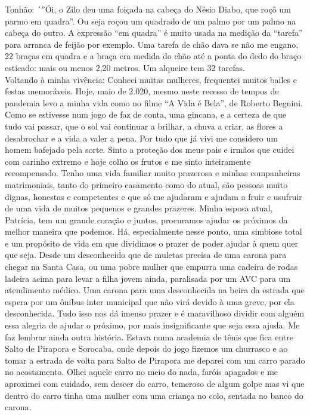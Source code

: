 \documentclass[12pt,brazil,]{book}
\begin{document}
Tonhão: ´''Ói, o Zilo deu uma foiçada na cabeça do Nésio Diabo, que roçô
um parmo em quadra''. Ou seja roçou um quadrado de um palmo por um palmo
na cabeça do outro. A expressão ``em quadra'' é muito usada na medição
da ``tarefa'' para arranca de feijão por exemplo. Uma tarefa de chão
dava se não me engano, 22 braças em quadra e a braça era medida do chão
até a ponta do dedo do braço esticado: mais ou menos 2,20 metros. Um
alqueire tem 32 tarefas.\\
Voltando à minha vivência: Conheci muitas mulheres, frequentei muitos
bailes e festas memoráveis. Hoje, maio de 2.020, mesmo neste recesso de
tempos de pandemia levo a minha vida como no filme ``A Vida é Bela'', de
Roberto Begnini. Como se estivesse num jogo de faz de conta, uma
gincana, e a certeza de que tudo vai passar, que o sol vai continuar a
brilhar, a chuva a criar, as flores a desabrochar e a vida a valer a
pena. Por tudo que já vivi me considero um homem bafejado pela sorte.
Sinto a proteção dos meus pais e irmãos que cuidei com carinho extremo e
hoje colho os frutos e me sinto inteiramente recompensado. Tenho uma
vida familiar muito prazerosa e minhas companheiras matrimoniais, tanto
do primeiro casamento como do atual, são pessoas muito dignas, honestas
e competentes e que só me ajudaram e ajudam a fruir e usufruir de uma
vida de muitos pequenos e grandes prazeres. Minha esposa atual,
Patrícia, tem um grande coração e juntos, procuramos ajudar os próximos
da melhor maneira que podemos. Há, especialmente nesse ponto, uma
simbiose total e um propósito de vida em que dividimos o prazer de poder
ajudar à quem quer que seja. Desde um desconhecido que de muletas
precisa de uma carona para chegar na Santa Casa, ou uma pobre mulher que
empurra uma cadeira de rodas ladeira acima para levar a filha jovem
ainda, paralisada por um AVC para um atendimento médico. Uma carona para
uma desconhecida na beira da estrada que espera por um ônibus inter
municipal que não virá devido à uma greve, por ela desconhecida. Tudo
isso nos dá imenso prazer e é maravilhoso dividir com alguém essa
alegria de ajudar o próximo, por mais insignificante que seja essa
ajuda. Me faz lembrar ainda outra história. Estava numa academia de
tênis que fica entre Salto de Pirapora e Sorocaba, onde depois do jogo
fizemos um churrasco e ao tomar a estrada de volta para Salto de
Pirapora me deparei com um carro parado no acostamento. Olhei aquele
carro no meio do nada, faróis apagados e me aproximei com cuidado, sem
descer do carro, temeroso de algum golpe mas vi que dentro do carro
tinha uma mulher com uma criança no colo, sentada no banco do carona.
\end{document}
